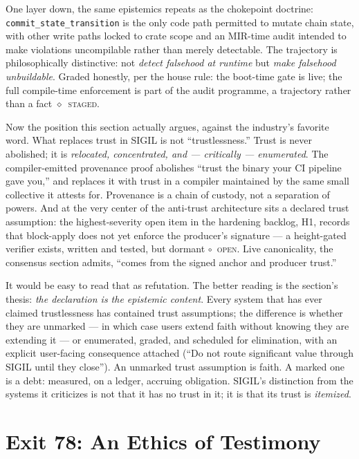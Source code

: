 \documentclass[10pt,a4paper]{article}
\newcommand{\stG}{\textcolor{sigilviolet}{$\diamond$}~{\scriptsize\textcolor{sigilviolet}{\textsc{staged}}}}
\newcommand{\stO}{\textcolor{sigilamber}{$\circ$}~{\scriptsize\textcolor{sigilamber}{\textsc{open}}}}
\begin{document}
One layer down, the same epistemics repeats as the chokepoint doctrine:
\texttt{commit\_state\_transition} is the only code path permitted to mutate chain
state, with other write paths locked to crate scope and an MIR-time audit intended
to make violations uncompilable rather than merely detectable. The trajectory is
philosophically distinctive: not \emph{detect falsehood at runtime} but \emph{make
falsehood unbuildable}. Graded honestly, per the house rule: the boot-time gate is
live; the full compile-time enforcement is part of the audit programme, a
trajectory rather than a fact \stG.

Now the position this section actually argues, against the industry's favorite
word. What replaces trust in SIGIL is not ``trustlessness.'' Trust is never
abolished; it is \emph{relocated, concentrated, and — critically — enumerated}. The
compiler-emitted provenance proof abolishes ``trust the binary your CI pipeline
gave you,'' and replaces it with trust in a compiler maintained by the same small
collective it attests for. Provenance is a chain of custody, not a separation of
powers. And at the very center of the
anti-trust architecture sits a declared trust assumption: the highest-severity open
item in the hardening backlog, H1, records that block-apply does not yet enforce
the producer's signature — a height-gated verifier exists, written and tested, but
dormant \stO. Live canonicality, the consensus section admits, ``comes from the
signed anchor and producer trust.''

It would be easy to read that as refutation. The better reading is the section's
thesis: \emph{the declaration is the epistemic content}. Every system that has ever
claimed trustlessness has contained trust assumptions; the difference is whether
they are unmarked — in which case users extend faith without knowing they are
extending it — or enumerated, graded, and scheduled for elimination, with an
explicit user-facing consequence attached (``Do not route significant value through
SIGIL until they close''). An unmarked trust assumption is faith. A marked one is a
debt: measured, on a ledger, accruing obligation. SIGIL's distinction from the
systems it criticizes is not that it has no trust in it; it is that its trust is
\emph{itemized}.

\section{Exit 78: An Ethics of Testimony}\label{sec:exit78}
\end{document}
